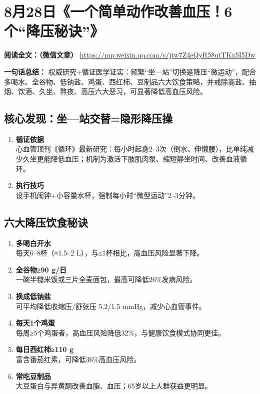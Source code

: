 \section{8月28日《一个简单动作改善血压！6个“降压秘诀”》}
\vspace{1cm}
\noindent\textbf{阅读全文：（微信文章）} \url{https://mp.weixin.qq.com/s/jtw7Z4eQyR58utTKx5I5Dw}

\textbf{一句话总结：}  
权威研究+循证医学证实：频繁“坐—站”切换是降压“微运动”，配合多喝水、全谷物、低钠盐、鸡蛋、西红柿、豆制品六大饮食策略，并戒除高盐、抽烟、饮酒、久坐、熬夜、高压六大恶习，可显著降低高血压风险。
\subsection{核心发现：坐—站交替=隐形降压操}
\begin{enumerate}[leftmargin=*, nosep]
    \item \textbf{循证依据}  \\
    心血管顶刊《循环》最新研究：每小时起身2–3次（倒水、伸懒腰），比单纯减少久坐更能降低血压；机制为激活下肢肌肉泵、缩短静坐时间、改善血液循环。
    \item \textbf{执行技巧}  \\
    设手机闹钟+小容量水杯，强制每小时“微型运动”2–3分钟。
\end{enumerate}

\subsection{六大降压饮食秘诀}
\begin{enumerate}[leftmargin=*, nosep]
    \item \textbf{多喝白开水}  \\
    每天6–8杯（≈1.5–2 L），与≤1杯相比，高血压风险显著下降。
    \item \textbf{全谷物≥90 g/日}  \\
    一碗半糙米饭或三片全麦面包，最高可降低26\%发病风险。
    \item \textbf{换成低钠盐}  \\
    可平均降低收缩压/舒张压 5.2/1.5 mmHg，减少心血管事件。
    \item \textbf{每天1个鸡蛋}  \\
    每周≥5个鸡蛋者，高血压风险降低32\%，与健康饮食模式协同更佳。
    \item \textbf{每日西红柿≥110 g}  \\
    富含番茄红素，可降低36\%高血压风险。
    \item \textbf{常吃豆制品}  \\
    大豆蛋白与异黄酮改善血脂、血压；65岁以上人群获益更明显。
\end{enumerate}

